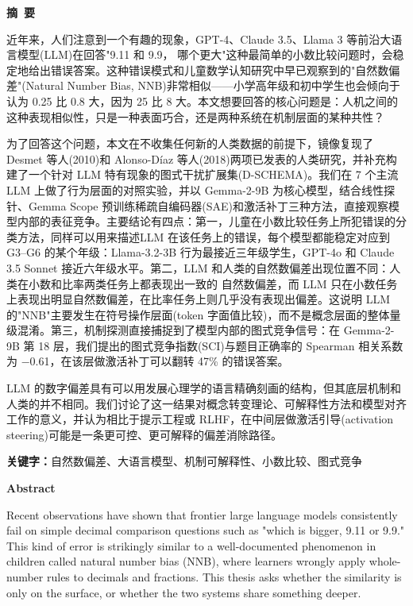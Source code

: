 \cleardoublepage{}
\begin{center}
    \bfseries {} 摘~要
\end{center}

近年来，人们注意到一个有趣的现象，GPT-4、Claude 3.5、Llama 3 等前沿大语言模型(LLM)在回答"9.11 和 9.9， 哪个更大"这种最简单的小数比较问题时，会稳定地给出错误答案。这种错误模式和儿童数学认知研究中早已观察到的"自然数偏差"(Natural Number Bias, NNB)非常相似——小学高年级和初中学生也会倾向于认为 0.25 比 0.8 大，因为 25 比 8 大。本文想要回答的核心问题是：人机之间的这种表现相似性，只是一种表面巧合，还是两种系统在机制层面的某种共性？

为了回答这个问题，本文在不收集任何新的人类数据的前提下，镜像复现了 Desmet 等人(2010)和 Alonso-Díaz 等人(2018)两项已发表的人类研究，并补充构建了一个针对 LLM 特有现象的图式干扰扩展集(D-SCHEMA)。我们在 7 个主流 LLM 上做了行为层面的对照实验，并以 Gemma-2-9B 为核心模型，结合线性探针、Gemma Scope 预训练稀疏自编码器(SAE)和激活补丁三种方法，直接观察模型内部的表征竞争。主要结论有四点：第一，儿童在小数比较任务上所犯错误的分类方法，同样可以用来描述LLM 在该任务上的错误，每个模型都能稳定对应到 G3–G6 的某个年级：Llama-3.2-3B 行为最接近三年级学生，GPT-4o 和 Claude 3.5 Sonnet 接近六年级水平。第二，LLM 和人类的自然数偏差出现位置不同：人类在小数和比率两类任务上都表现出一致的 自然数偏差，而 LLM 只在小数任务上表现出明显自然数偏差，在比率任务上则几乎没有表现出偏差。这说明 LLM 的"NNB"主要发生在符号操作层面(token 字面值比较)，而不是概念层面的整体量级混淆。第三，机制探测直接捕捉到了模型内部的图式竞争信号：在 Gemma-2-9B 第 18 层，我们提出的图式竞争指数(SCI)与题目正确率的 Spearman 相关系数为 −0.61，在该层做激活补丁可以翻转 47\% 的错误答案。

LLM 的数字偏差具有可以用发展心理学的语言精确刻画的结构，但其底层机制和人类的并不相同。我们讨论了这一结果对概念转变理论、可解释性方法和模型对齐工作的意义，并认为相比于提示工程或 RLHF，在中间层做激活引导(activation steering)可能是一条更可控、更可解释的偏差消除路径。

\par \noindent \textbf{关键字：}自然数偏差、大语言模型、机制可解释性、小数比较、图式竞争

\cleardoublepage{}
\begin{center}
    \bfseries {} Abstract
\end{center}

Recent observations have shown that frontier large language models consistently fail on simple decimal comparison questions such as "which is bigger, 9.11 or 9.9." This kind of error is strikingly similar to a well-documented phenomenon in children called natural number bias (NNB), where learners wrongly apply whole-number rules to decimals and fractions. This thesis asks whether the similarity is only on the surface, or whether the two systems share something deeper.

